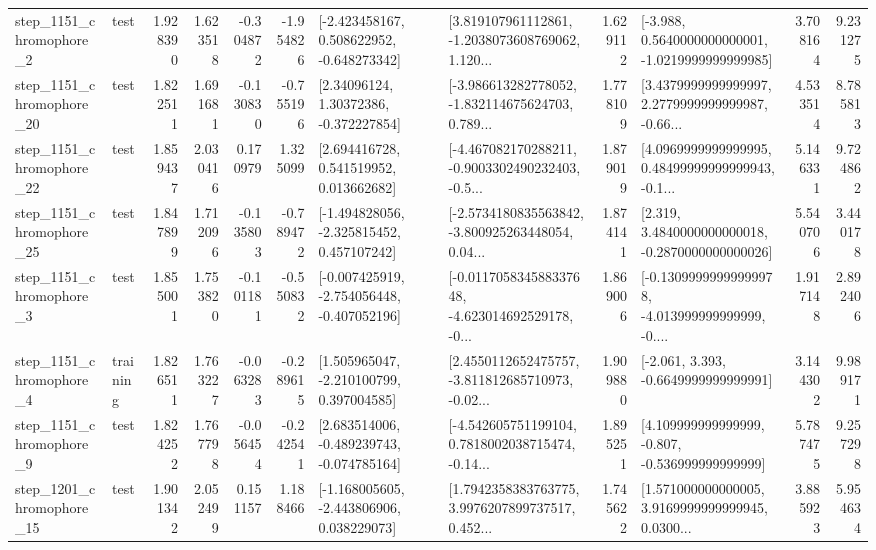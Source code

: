 \begin{tabular}{llrrrrllrlrr}
  step\_1151\_chromophore\_2 &      test &      1.928390 &    1.623518 &     -0.304872 & -1.954826 &   [-2.423458167, 0.508622952, -0.648273342] &  [3.819107961112861, -1.2038073608769062, 1.120... &       1.629112 &  [-3.988, 0.5640000000000001, -1.0219999999999985] &            3.708164 &          9.231275 \\
 step\_1151\_chromophore\_20 &      test &      1.822511 &    1.691681 &     -0.130830 & -0.755196 &      [2.34096124, 1.30372386, -0.372227854] &  [-3.986613282778052, -1.832114675624703, 0.789... &       1.778109 &  [3.4379999999999997, 2.2779999999999987, -0.66... &            4.533514 &          8.785813 \\
 step\_1151\_chromophore\_22 &      test &      1.859437 &    2.030416 &      0.170979 &  1.325099 &     [2.694416728, 0.541519952, 0.013662682] &  [-4.467082170288211, -0.9003302490232403, -0.5... &       1.879019 &  [4.0969999999999995, 0.48499999999999943, -0.1... &            5.146331 &          9.724862 \\
 step\_1151\_chromophore\_25 &      test &      1.847899 &    1.712096 &     -0.135803 & -0.789472 &   [-1.494828056, -2.325815452, 0.457107242] &  [-2.5734180835563842, -3.800925263448054, 0.04... &       1.874141 &   [2.319, 3.4840000000000018, -0.2870000000000026] &            5.540706 &          3.440178 \\
  step\_1151\_chromophore\_3 &      test &      1.855001 &    1.753820 &     -0.101181 & -0.550832 &  [-0.007425919, -2.754056448, -0.407052196] &  [-0.011705834588337648, -4.623014692529178, -0... &       1.869006 &  [-0.13099999999999978, -4.013999999999999, -0.... &            1.917148 &          2.892406 \\
  step\_1151\_chromophore\_4 &  training &      1.826511 &    1.763227 &     -0.063283 & -0.289615 &    [1.505965047, -2.210100799, 0.397004585] &  [2.4550112652475757, -3.811812685710973, -0.02... &       1.909880 &               [-2.061, 3.393, -0.6649999999999991] &            3.144302 &          9.989171 \\
  step\_1151\_chromophore\_9 &      test &      1.824252 &    1.767798 &     -0.056454 & -0.242541 &   [2.683514006, -0.489239743, -0.074785164] &  [-4.542605751199104, 0.7818002038715474, -0.14... &       1.895251 &    [4.109999999999999, -0.807, -0.536999999999999] &            5.787475 &          9.257298 \\
 step\_1201\_chromophore\_15 &      test &      1.901342 &    2.052499 &      0.151157 &  1.188466 &   [-1.168005605, -2.443806906, 0.038229073] &  [1.7942358383763775, 3.9976207899737517, 0.452... &       1.745622 &  [1.571000000000005, 3.9169999999999945, 0.0300... &            3.885923 &          5.954634 \\

\end{tabular}
